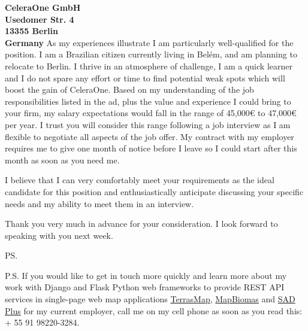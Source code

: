 \documentclass[a4paper]{joaosoares-letter}
\begin{document}
\begin{letter}{\bfseries CeleraOne GmbH\\Usedomer Str. 4 \\13355 Berlin\\Germany}
As my experiences illustrate I am particularly well-qualified for the position. I am a Brazilian citizen currently living in Belém, and am planning to relocate to Berlin. I thrive in an atmosphere of challenge, I am a quick learner and I do not spare any effort or time to find potential weak spots which will boost the gain of CeleraOne. Based on my understanding of the job responsibilities listed in the ad, plus the value and experience I could bring to your firm, my salary expectations would fall in the range of 45,000€ to 47,000€ per year. I trust you will consider this range following a job interview as I am flexible to negotiate all aspects of the job offer. My contract with my employer requires me to give one month of notice before I leave so I could start after this month as soon as you need me.

I believe that I can very comfortably meet your requirements as the ideal candidate for this position and enthusiastically anticipate discussing your specific needs and my ability to meet them in an interview.

\closing{Thank you very much in advance for your consideration. I look forward to speaking with you next week.}
\vspace{10pt}
\ps

P.S. If you would like to get in touch more quickly and learn more about my work with Django and Flask Python web frameworks to provide REST API services in single-page web map applications \href{https://goo.gl/6gUzPA}{TerrasMap}, \href{https://goo.gl/eYX5SW}{MapBiomas} and \href{https://goo.gl/2J41hR}{SAD Plus} for my current employer, call me on my cell phone as soon as you read this: + 55 91 98220-3284.
\vspace{\fill}

\end{letter}
\end{document}
